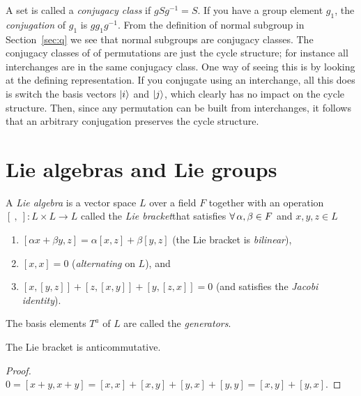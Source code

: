 A set is called a {\it conjugacy class} if 
$gSg^{-1}=S$. If you have a group element $g_1$, the 
{\it conjugation} of $g_1$ is $gg_1g^{-1}$.
From the definition of normal subgroup in Section~\ref{sec:q} we
see that normal subgroups are conjugacy classes. The conjugacy classes
of of permutations are just the cycle structure; for instance all
interchanges are in the same conjugacy class. One way of seeing this
is by looking at the defining representation. If you conjugate using
an interchange, all this does is switch the basis vectors
$\ket{i}$ and $\ket{j}$, which clearly has no impact on the cycle
structure. Then, since any permutation can be built from interchanges,
it follows that an arbitrary conjugation preserves the cycle
structure. 

\section{Lie algebras and Lie groups}

  A {\it Lie algebra} is a vector space $L$ over a field $F$
  together with an operation $[\ ,\ ]:L\times L\to L$ called the 
  {\it Lie bracket}that satisfies 
  $\operatorname{\forall} \alpha,\beta\in F$ 
  and $x,y,z\in L$
  \begin{enumerate}
    \item $[\alpha x+\beta y,z]=\alpha[x,z]+\beta[y,z]$ (the Lie bracket is 
          {\it bilinear}),
    \item $[x,x]=0$ ({\it alternating} on $L$), and
    \item $[x,[y,z]]+[z,[x,y]]+[y,[z,x]]=0$ (and satisfies the {\it Jacobi
          identity}).
  \end{enumerate}
  The basis elements $T^a$ of $L$ are called the {\it generators}.

\begin{proposition}{}{}
  The Lie bracket is anticommutative.
  \begin{proof}
    $0=[x+y,x+y]=[x,x]+[x,y]+[y,x]+[y,y]=[x,y]+[y,x].$
  \end{proof}
\end{proposition}

